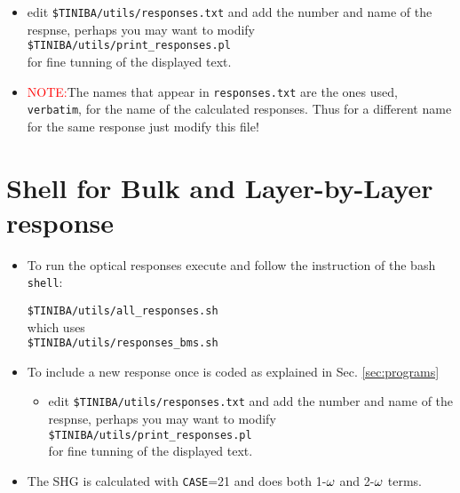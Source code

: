 \begin{itemize}
\begin{itemize}
\begin{itemize}
\item edit
\verb=$TINIBA/utils/responses.txt=  
and add the
 number and name of the respnse, perhaps you may want to modify\\
\verb=$TINIBA/utils/print_responses.pl=\\ for fine tunning
of the displayed text. 
\item\textcolor{red}{NOTE:}The names that appear in
  \verb=responses.txt= are the ones used, \verb=verbatim=, for the name
  of the calculated responses. Thus for a different name for the same
  response just modify this file!
\end{itemize}
\end{itemize}

\end{itemize}


\section{Shell for Bulk and Layer-by-Layer response}

\begin{itemize}

\item To run the optical responses execute and follow the instruction of the bash \verb=shell=:

  \verb=$TINIBA/utils/all_responses.sh=\\
which uses\\
\verb=$TINIBA/utils/responses_bms.sh=

\item To include a new response once is coded as explained in
 Sec. \ref{sec:programs} 

\begin{itemize}
\item edit
\verb=$TINIBA/utils/responses.txt=  
and add the
 number and name of the respnse, perhaps you may want to modify\\
\verb=$TINIBA/utils/print_responses.pl=\\ for fine tunning
of the displayed text.
\end{itemize}
\item The SHG is calculated with \verb=CASE==21 and does both 1-$\omega$
  and 2-$\omega$ terms.
\end{itemize}
